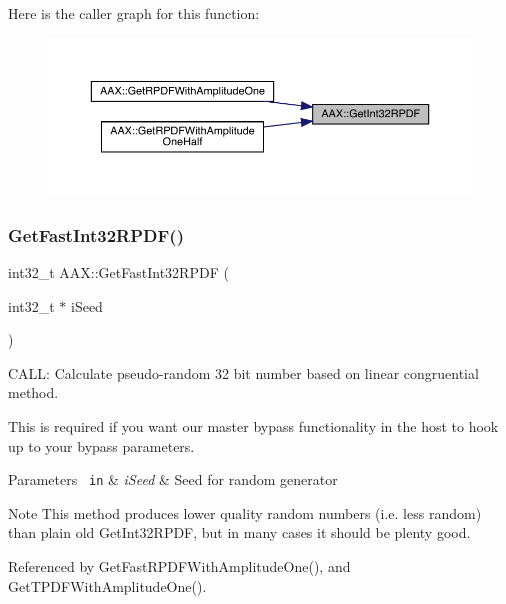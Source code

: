 Here is the caller graph for this function\+:
\nopagebreak
\begin{figure}[H]
\begin{center}
\leavevmode
\includegraphics[width=350pt]{a00852_af3435129d3c94c5f3d5e671943b9bbe2_icgraph}
\end{center}
\end{figure}
\mbox{\label{a00852_ad12251899137d551b9f652b1ffee2f99}} 
\subsubsection{\texorpdfstring{GetFastInt32RPDF()}{GetFastInt32RPDF()}}
{\footnotesize\ttfamily int32\+\_\+t A\+A\+X\+::\+Get\+Fast\+Int32\+R\+P\+DF (\begin{DoxyParamCaption}\item[{int32\+\_\+t $\ast$}]{i\+Seed }\end{DoxyParamCaption})\hspace{0.3cm}{\ttfamily [inline]}}



C\+A\+LL\+: Calculate pseudo-\/random 32 bit number based on linear congruential method. 

This is required if you want our master bypass functionality in the host to hook up to your bypass parameters.


\begin{DoxyParams}[1]{Parameters}
\mbox{\texttt{ in}}  & {\em i\+Seed} & Seed for random generator\\
\hline
\end{DoxyParams}
\begin{DoxyNote}{Note}
This method produces lower quality random numbers (i.\+e. less random) than plain old Get\+Int32\+R\+P\+DF, but in many cases it should be plenty good. 
\end{DoxyNote}


Referenced by Get\+Fast\+R\+P\+D\+F\+With\+Amplitude\+One(), and Get\+T\+P\+D\+F\+With\+Amplitude\+One().

